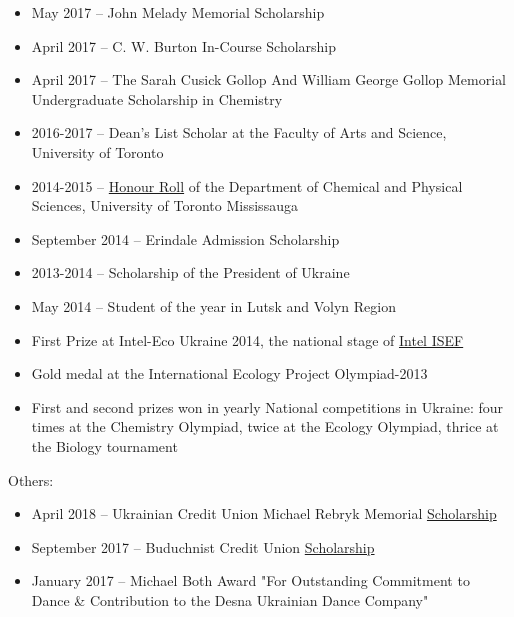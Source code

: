 \documentclass[9pt, margin]{res}
\begin{document}
\begin{resume}
\begin{itemize}
	\item May 2017 -- John Melady Memorial Scholarship %
	\item April 2017 -- C. W. Burton In-Course Scholarship %
	\item April 2017 -- The Sarah Cusick Gollop And William George Gollop Memorial Undergraduate Scholarship in Chemistry %
	\item 2016-2017 -- Dean’s List Scholar at the Faculty of Arts and Science, University of Toronto
	\item 2014-2015 --  \href{https://www.utm.utoronto.ca/cps/honour-roll/2014-15}{Honour Roll} of the Department of Chemical and Physical Sciences, University of Toronto Mississauga
	\item September 2014 -- Erindale Admission Scholarship %
	\item 2013-2014 -- Scholarship of the President of Ukraine %
	\item May 2014 -- Student of the year in Lutsk and Volyn Region %
	\item First Prize at Intel-Eco Ukraine 2014, the national stage of \href{https://student.societyforscience.org/intel-isef}{Intel ISEF}
	\item Gold medal at the International Ecology Project Olympiad-2013
	\item First and second prizes won in yearly National competitions in Ukraine: four times at the  Chemistry Olympiad, twice at the Ecology Olympiad, thrice at the Biology tournament
\end{itemize}
Others:
\begin{itemize}
	\item April 2018 -- Ukrainian Credit Union  Michael Rebryk Memorial  \href{http://ucu-building-community.blogspot.ca/2016/03/ucu-adds-new-scholarships-in-2016.html}{Scholarship}
	\item September 2017 -- Buduchnist Credit Union \href{http://www.buduchnist.com/scholarships}{Scholarship} %
	\item January 2017 -- Michael Both Award "For Outstanding Commitment to Dance \& Contribution to the Desna Ukrainian Dance Company" %
\end{itemize}



\end{resume}
\end{document}
